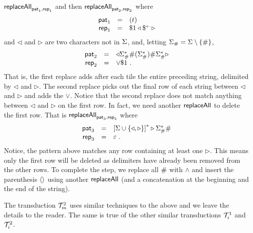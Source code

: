 $\mathsf{replaceAll}_{\mathsf{pat}_1, \mathsf{rep}_1}$ and then $\mathsf{replaceAll}_{\mathsf{pat}_2, \mathsf{rep}_2}$ where
\[
    \begin{array}{rcl}
        \mathsf{pat}_1 &=& (t) \\
        \mathsf{rep}_1 &=& \$1 \triangleleft \$^{\leftarrow} \triangleright
    \end{array}
\]
and $\triangleleft$ and $\triangleright$ are two characters not in $\Sigma$,
and, letting $\Sigma_\# = \Sigma \setminus \{ \# \}$,
\[
    \begin{array}{rcl}
        \mathsf{pat}_2 &=& \triangleleft
                \Sigma_\#^\ast \# (
                    \Sigma_\#^\ast
                ) \# \Sigma_\#^\ast
            \triangleright \\
        \mathsf{rep}_2 &=& \lor \$1 \ .
    \end{array}
\]
That is, the first replace adds after each tile the entire preceding string,
delimited by $\triangleleft$ and $\triangleright$. The second replace picks out
the final row of each string between $\triangleleft$ and $\triangleright$ and
adds the $\lor$. Notice that the second replace does not match anything between
$\triangleleft$ and $\triangleright$ on the first row. In fact, we need another
$\mathsf{replaceAll}$ to delete the first row. That is $\mathsf{replaceAll}_{\mathsf{pat}_3, \mathsf{rep}_3}$
where
\[
    \begin{array}{rcl}
        \mathsf{pat}_3 &=& \left[
            \Sigma \cup \{ \triangleleft, \triangleright \}
            \right]^\ast \triangleright \Sigma_\#^\ast \# \\
        \mathsf{rep}_3 &=& \varepsilon \ .
    \end{array}
\]
Notice, the pattern above matches any row containing at least one
$\triangleright$. This means only the first row will be deleted as delimiters
have already been removed from the other rows.  To complete the step, we
replace all $\#$ with $\land$ and insert the parenthesis $\left\langle\right\rangle$ using another $\mathsf{replaceAll}$ (and a concatenation at the beginning and the end of the string).

The transduction $\mathcal{T}^2_m$ uses similar techniques to the above and
we leave the details to the reader. The same is true of the other similar
transductions $\mathcal{T}^1_{i}$ and $\mathcal{T}^2_{i}$.

